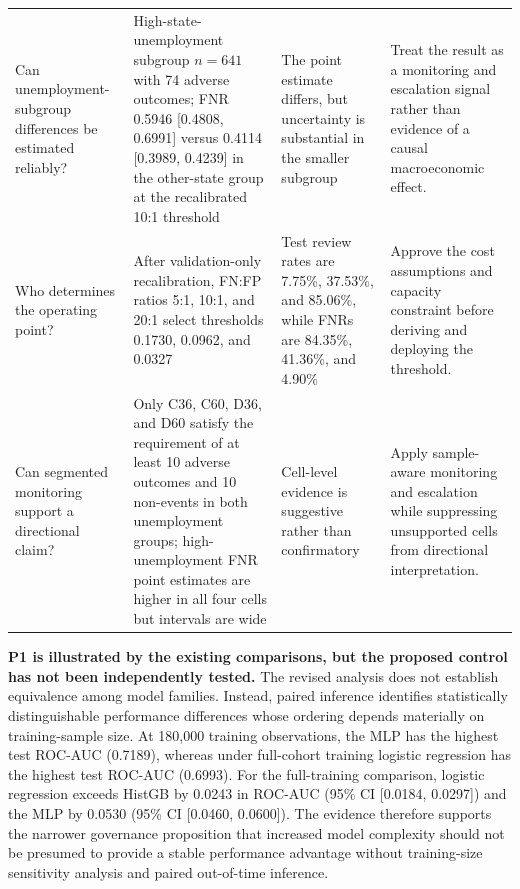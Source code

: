 \documentclass[10pt]{article}
\begin{document}
\begin{table}[!ht]
{\begin{tabular}{L{3.0cm}L{4.6cm}L{3.4cm}L{5.2cm}}
Can unemployment-subgroup differences be estimated reliably? & High-state-unemployment subgroup $n=641$ with 74 adverse outcomes; FNR 0.5946 [0.4808, 0.6991] versus 0.4114 [0.3989, 0.4239] in the other-state group at the recalibrated 10:1 threshold & The point estimate differs, but uncertainty is substantial in the smaller subgroup & Treat the result as a monitoring and escalation signal rather than evidence of a causal macroeconomic effect. \\
Who determines the operating point? & After validation-only recalibration, FN:FP ratios 5:1, 10:1, and 20:1 select thresholds 0.1730, 0.0962, and 0.0327 & Test review rates are 7.75\%, 37.53\%, and 85.06\%, while FNRs are 84.35\%, 41.36\%, and 4.90\% & Approve the cost assumptions and capacity constraint before deriving and deploying the threshold. \\
Can segmented monitoring support a directional claim? & Only C36, C60, D36, and D60 satisfy the requirement of at least 10 adverse outcomes and 10 non-events in both unemployment groups; high-unemployment FNR point estimates are higher in all four cells but intervals are wide & Cell-level evidence is suggestive rather than confirmatory & Apply sample-aware monitoring and escalation while suppressing unsupported cells from directional interpretation. \\
\bottomrule
\end{tabular}}
\end{table}

\textbf{P1 is illustrated by the existing comparisons, but the proposed control has not been independently tested.} The revised analysis does not establish equivalence among model families. Instead, paired inference identifies statistically distinguishable performance differences whose ordering depends materially on training-sample size. At 180,000 training observations, the MLP has the highest test ROC-AUC (0.7189), whereas under full-cohort training logistic regression has the highest test ROC-AUC (0.6993). For the full-training comparison, logistic regression exceeds HistGB by 0.0243 in ROC-AUC (95\% CI [0.0184, 0.0297]) and the MLP by 0.0530 (95\% CI [0.0460, 0.0600]). The evidence therefore supports the narrower governance proposition that increased model complexity should not be presumed to provide a stable performance advantage without training-size sensitivity analysis and paired out-of-time inference.
\end{document}
